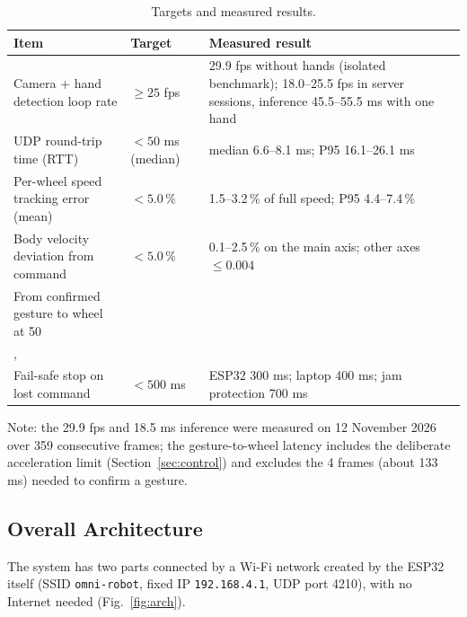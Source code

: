 \documentclass[11pt,a4paper]{article}
\newcommand{\code}[1]{\texttt{\small #1}}
\begin{document}
\begin{table}[H]
\caption{Targets and measured results.}
\label{tab:spec}
\centering\small
\begin{tabular}{p{4.6cm}p{2.3cm}p{5.2cm}}
\toprule
Item & Target & Measured result \\
\midrule
Camera + hand detection loop rate & $\ge 25$ fps & 29.9 fps without hands (isolated benchmark); 18.0--25.5 fps in server sessions, inference 45.5--55.5 ms with one hand \\
UDP round-trip time (RTT) & $<50$ ms (median) & median 6.6--8.1 ms; P95 16.1--26.1 ms \\
Per-wheel speed tracking error (mean) & $<5.0\,\%$ & 1.5--3.2\,\% of full speed; P95 4.4--7.4\,\% \\
Body velocity deviation from command & $<5.0\,\%$ & 0.1--2.5\,\% on the main axis; other axes $\le 0.004$ \\
From confirmed gesture to wheel at 50\\,\\%
Fail-safe stop on lost command & $<500$ ms & ESP32 300 ms; laptop 400 ms; jam protection 700 ms \\
\bottomrule
\end{tabular}
\end{table}
Note: the 29.9 fps and 18.5 ms inference were measured on 12 November 2026 over 359 consecutive frames; the gesture-to-wheel latency includes the deliberate acceleration limit (Section~\ref{sec:control}) and excludes the 4 frames (about 133 ms) needed to confirm a gesture.

\subsection{Overall Architecture}
The system has two parts connected by a Wi-Fi network created by the ESP32 itself (SSID \code{omni-robot}, fixed IP \code{192.168.4.1}, UDP port 4210), with no Internet needed (Fig.~\ref{fig:arch}).
\end{document}
